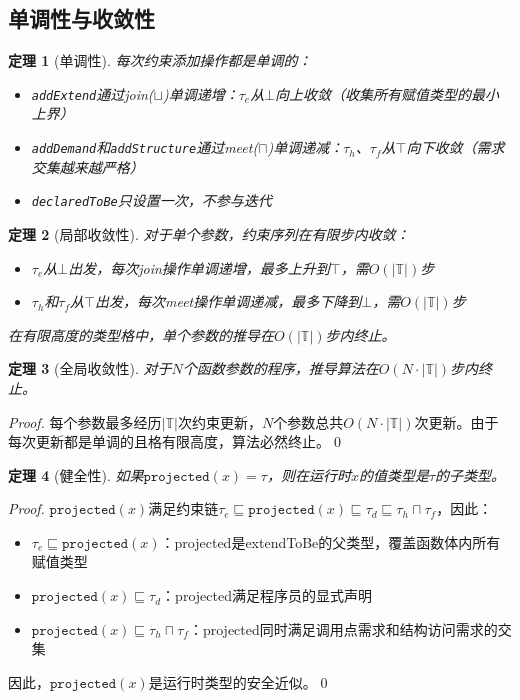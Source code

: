 \documentclass[UTF8]{article}
\newtheorem{theorem}{定理}[section]
\newcommand{\projected}{\texttt{projected}}
\begin{document}
\subsection{单调性与收敛性}
\label{sec:convergence}

\begin{theorem}[单调性]
\label{thm:monotone}
每次约束添加操作都是单调的：
\begin{itemize}[leftmargin=2em]
\item \texttt{addExtend}通过join($\sqcup$)单调递增：$\tau_e$从$\bot$向上收敛（收集所有赋值类型的最小上界）
\item \texttt{addDemand}和\texttt{addStructure}通过meet($\sqcap$)单调递减：$\tau_h$、$\tau_f$从$\top$向下收敛（需求交集越来越严格）
\item \texttt{declaredToBe}只设置一次，不参与迭代
\end{itemize}
\end{theorem}

\begin{theorem}[局部收敛性]
\label{thm:local-conv}
对于单个参数，约束序列在有限步内收敛：
\begin{itemize}[leftmargin=2em]
\item $\tau_e$从$\bot$出发，每次join操作单调递增，最多上升到$\top$，需$O(|\mathbb{T}|)$步
\item $\tau_h$和$\tau_f$从$\top$出发，每次meet操作单调递减，最多下降到$\bot$，需$O(|\mathbb{T}|)$步
\end{itemize}
在有限高度的类型格中，单个参数的推导在$O(|\mathbb{T}|)$步内终止。
\end{theorem}

\begin{theorem}[全局收敛性]
\label{thm:convergence}
对于$N$个函数参数的程序，推导算法在$O(N \cdot |\mathbb{T}|)$步内终止。
\end{theorem}

\begin{proof}
每个参数最多经历$|\mathbb{T}|$次约束更新，$N$个参数总共$O(N \cdot |\mathbb{T}|)$次更新。由于每次更新都是单调的且格有限高度，算法必然终止。\qed
\end{proof}

\begin{theorem}[健全性]
\label{thm:soundness}
如果$\projected(x) = \tau$，则在运行时$x$的值类型是$\tau$的子类型。
\end{theorem}

\begin{proof}
$\projected(x)$满足约束链$\tau_e \sqsubseteq \projected(x) \sqsubseteq \tau_d \sqsubseteq \tau_h \sqcap \tau_f$，因此：
\begin{itemize}[leftmargin=2em]
\item $\tau_e \sqsubseteq \projected(x)$：projected是extendToBe的父类型，覆盖函数体内所有赋值类型
\item $\projected(x) \sqsubseteq \tau_d$：projected满足程序员的显式声明
\item $\projected(x) \sqsubseteq \tau_h \sqcap \tau_f$：projected同时满足调用点需求和结构访问需求的交集
\end{itemize}
因此，$\projected(x)$是运行时类型的安全近似。\qed
\end{proof}
\end{document}
